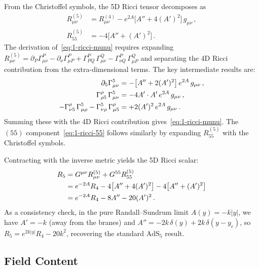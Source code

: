 From the Christoffel symbols, the 5D Ricci tensor decomposes as
\begin{align}
R^{(5)}_{\mu\nu} &= R^{(4)}_{\mu\nu} - e^{2A}\bigl[A'' + 4(A')^2\bigr]\, g_{\mu\nu}\,, \label{eq:1-ricci-munu}\\
R^{(5)}_{55} &= -4\bigl[A'' + (A')^2\bigr]\,. \label{eq:1-ricci-55}
\end{align}
The derivation of~\eqref{eq:1-ricci-munu} requires expanding $R^{(5)}_{\mu\nu} = \partial_P \Gamma^P_{\mu\nu} - \partial_\nu \Gamma^P_{\mu P} + \Gamma^P_{PQ}\, \Gamma^Q_{\mu\nu} - \Gamma^P_{\nu Q}\, \Gamma^Q_{\mu P}$ and separating the 4D Ricci contribution from the extra-dimensional terms. The key intermediate results are:
\begin{align}
\partial_5 \Gamma^5_{\mu\nu} &= -\bigl[A'' + 2(A')^2\bigr]\, e^{2A}\, g_{\mu\nu}\,, \notag\\
\Gamma^\rho_{\rho 5}\, \Gamma^5_{\mu\nu} &= -4A' \cdot A'\, e^{2A}\, g_{\mu\nu}\,, \notag\\
-\Gamma^\rho_{\nu 5}\, \Gamma^5_{\mu\rho} - \Gamma^5_{\nu\rho}\, \Gamma^\rho_{\mu 5} &= +2(A')^2\, e^{2A}\, g_{\mu\nu}\,. \notag
\end{align}
Summing these with the 4D Ricci contribution gives~\eqref{eq:1-ricci-munu}. The $(55)$ component~\eqref{eq:1-ricci-55} follows similarly by expanding $R^{(5)}_{55}$ with the Christoffel symbols.

Contracting with the inverse metric yields the 5D Ricci scalar:
\begin{align}
\label{eq:1-ricci-scalar}
R_5 &= G^{\mu\nu} R^{(5)}_{\mu\nu} + G^{55} R^{(5)}_{55} \notag\\
    &= e^{-2A} R_4 - 4\bigl[A'' + 4(A')^2\bigr] - 4\bigl[A'' + (A')^2\bigr] \notag\\
    &= e^{-2A} R_4 - 8A'' - 20(A')^2\,.
\end{align}
As a consistency check, in the pure Randall--Sundrum limit $A(y) = -k|y|$, we have $A' = -k$ (away from the branes) and $A'' = -2k\,\delta(y) + 2k\,\delta(y - y_c)$, so $R_5 = e^{2k|y|} R_4 - 20k^2$, recovering the standard $\mathrm{AdS}_5$ result.

\subsection{Field Content}
\label{sec:1-field-content}

